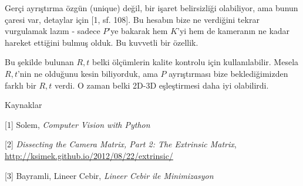 \documentclass[12pt,fleqn]{article}\usepackage{../../common}
\begin{document}
Gerçi ayrıştırma özgün (unique) değil, bir işaret belirsizliği olabiliyor,
ama bunun çaresi var, detaylar için [1, sf. 108]. Bu hesabın bize ne
verdiğini tekrar vurgulamak lazım - sadece $P$'ye bakarak hem $K$'yi hem de
kameranın ne kadar hareket ettiğini bulmuş olduk. Bu kuvvetli bir özellik.

Bu şekilde bulunan $R,t$ belki ölçümlerin kalite kontrolu için
kullanılabilir. Mesela $R,t$'nin ne olduğunu kesin biliyorduk, ama $P$
ayrıştırması bize beklediğimizden farklı bir $R,t$ verdi. O zaman belki
2D-3D eşleştirmesi daha iyi olabilirdi.


Kaynaklar

[1] Solem, {\em Computer Vision with Python}

[2] {\em Dissecting the Camera Matrix, Part 2: The Extrinsic Matrix}, \url{http://ksimek.github.io/2012/08/22/extrinsic/}

[3] Bayramli, Lineer Cebir, {\em Lineer Cebir ile Minimizasyon}
\end{document}
